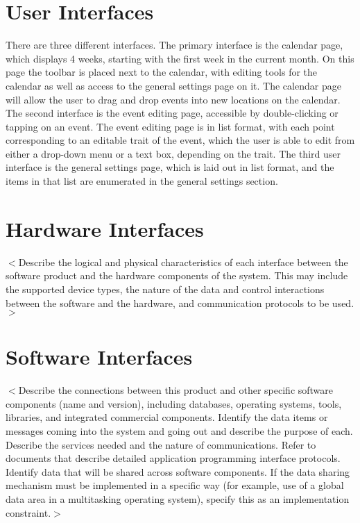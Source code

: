 \documentclass{scrreprt}
\begin{document}
\section{User Interfaces}
There are three different interfaces. The primary interface is the calendar page, which displays 4 weeks, starting with the first week in the current month. On this page the toolbar is placed next to the calendar, with editing tools for the calendar as well as access to the general settings page on it. The calendar page will allow the user to drag and drop events into new locations on the calendar. The second interface is the event editing page, accessible by double-clicking or tapping on an event. The event editing page is in list format, with each point corresponding to an editable trait of the event, which the user is able to edit from either a drop-down menu or a text box, depending on the trait. The third user interface is the general settings page, which is laid out in list format, and the items in that list are enumerated in the general settings section.



\section{Hardware Interfaces}
$<$Describe the logical and physical characteristics of each interface between
the software product and the hardware components of the system. This may include
the supported device types, the nature of the data and control interactions
between the software and the hardware, and communication protocols to be
used.$>$

\section{Software Interfaces}
$<$Describe the connections between this product and other specific software
components (name and version), including databases, operating systems, tools,
libraries, and integrated commercial components. Identify the data items or
messages coming into the system and going out and describe the purpose of each.
Describe the services needed and the nature of communications. Refer to
documents that describe detailed application programming interface protocols.
Identify data that will be shared across software components. If the data
sharing mechanism must be implemented in a specific way (for example, use of a
global data area in a multitasking operating system), specify this as an
implementation constraint.$>$
\end{document}
